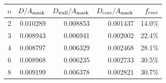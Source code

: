 \begin{tabular}{@{}crrrr@{}}
\toprule
$n$ & $D/A_{\rm mask}$ & $D_{\rm wall}/A_{\rm mask}$ & $D_{\rm core}/A_{\rm mask}$ & $f_{\rm core}$ \\
\midrule
2 & 0.010289 & 0.008853 & 0.001437 & 14.0\% \\
3 & 0.008943 & 0.006941 & 0.002002 & 22.4\% \\
4 & 0.008797 & 0.006329 & 0.002468 & 28.1\% \\
6 & 0.008968 & 0.006235 & 0.002733 & 30.5\% \\
8 & 0.009199 & 0.006378 & 0.002821 & 30.7\% \\
\bottomrule
\end{tabular}
